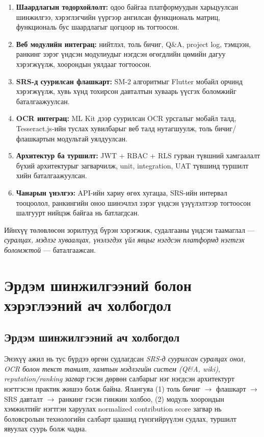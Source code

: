 \begin{enumerate}[label=\textbf{\arabic*.}, leftmargin=2em, itemsep=0.35em]
    \item \textbf{Шаардлагын тодорхойлолт:} одоо байгаа платформуудын харьцуулсан шинжилгээ, хэрэглэгчийн үүргээр ангилсан функциональ матриц, функциональ бус шаардлагыг цогцоор нь тогтоосон.
    \item \textbf{Веб модулийн интеграц:} нийтлэл, толь бичиг, Q\&A, project log, тэмцээн, ранкинг зэрэг үндсэн модулиудыг нэгдсэн өгөгдлийн цөмийн дагуу хэрэгжүүлж, хоорондын уялдааг тогтоосон.
    \item \textbf{SRS-д суурилсан флашкарт:} SM-2 алгоритмыг Flutter мобайл орчинд хэрэгжүүлж, хувь хүнд тохирсон давталтын хуваарь үүсгэх боломжийг баталгаажуулсан.
    \item \textbf{OCR интеграц:} ML Kit дээр суурилсан OCR урсгалыг мобайл талд, Tesseract.js-ийн туслах хувилбарыг веб талд нутагшуулж, толь бичиг/флашкартын модультай уялдуулсан.
    \item \textbf{Архитектур ба туршилт:} JWT + RBAC + RLS гурван түвшний хамгаалалт бүхий архитектурыг загварчилж, unit, integration, UAT түвшинд туршилт хийн баталгаажуулсан.
    \item \textbf{Чанарын үнэлгээ:} API-ийн хариу өгөх хугацаа, SRS-ийн интервал тооцоолол, ранкингийн оноо шинэчлэл зэрэг үндсэн үзүүлэлтээр тогтоосон шалгуурт нийцэж байгаа нь батлагдсан.
\end{enumerate}

Ийнхүү төлөвлөсөн зорилтууд бүрэн хэрэгжиж, судалгааны үндсэн таамаглал --- \textit{суралцах, мэдлэг хуваалцах, үнэлэгдэх үйл явцыг нэгдсэн платформд нэгтгэх боломжтой} --- баталгаажсан.


\section{Эрдэм шинжилгээний болон хэрэглээний ач холбогдол}

\subsection{Эрдэм шинжилгээний ач холбогдол}

Энэхүү ажил нь тус бүрдээ өргөн судлагдсан \textit{SRS-д суурилсан суралцах онол}, \textit{OCR болон текст танилт}, \textit{хамтын мэдлэгийн систем (Q\&A, wiki)}, \textit{reputation/ranking загвар} гэсэн дөрвөн салбарыг нэг нэгдсэн архитектурт нэгтгэсэн практик жишээ болж байна. Ялангуяа (1) толь бичиг $\rightarrow$ флашкарт $\rightarrow$ SRS давталт $\rightarrow$ ранкинг гэсэн гинжин холбоо, (2) модуль хоорондын хэмжилтийг нэгтгэн харуулах normalized contribution score загвар нь боловсролын технологийн салбарт цаашид гүнзгийрүүлэн судлах, туршилт явуулах суурь болж чадна.

